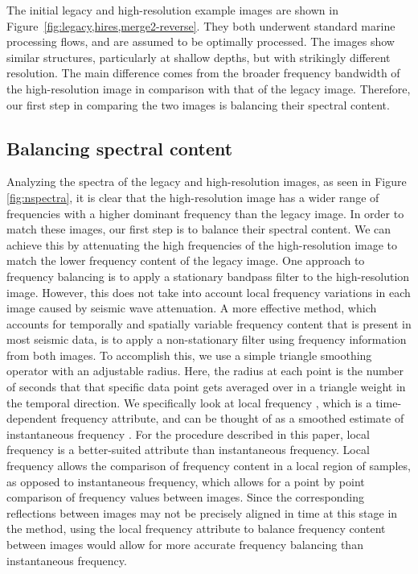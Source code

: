 The initial legacy and high-resolution example images are shown in Figure~\ref{fig:legacy,hires,merge2-reverse}.
They both underwent standard marine processing flows, and are assumed to be optimally processed.
The images show similar structures, particularly at shallow depths, but with strikingly different resolution.
The main difference comes from the broader frequency bandwidth of the high-resolution image in comparison with that of the legacy image.
Therefore, our first step in comparing the two images is balancing their spectral content.

\subsection{Balancing spectral content}

Analyzing the spectra of the legacy and high-resolution images, as seen in Figure \ref{fig:nspectra}, it is clear that the high-resolution image has a wider range of frequencies with a higher dominant frequency than the legacy image.
In order to match these images, our first step is to balance their spectral content.
We can achieve this by attenuating the high frequencies of the high-resolution image to match the lower frequency content of the legacy image.
One approach to frequency balancing is to apply a stationary bandpass filter to the high-resolution image.
However, this does not take into account local frequency variations in each image caused by seismic wave attenuation.
A more effective method, which accounts for temporally and spatially variable frequency content that is present in most seismic data, is to apply a non-stationary filter using frequency information from both images.
To accomplish this, we use a simple triangle smoothing operator with an adjustable radius.
Here, the radius at each point is the number of seconds that that specific data point gets averaged over in a triangle weight in the temporal direction.
We specifically look at local frequency \cite[]{attr}, which is a time-dependent frequency attribute, and can be thought of as a smoothed estimate of instantaneous frequency \cite[]{white}.
For the procedure described in this paper, local frequency is a better-suited attribute than instantaneous frequency.
Local frequency allows the comparison of frequency content in a local region of samples, as opposed to instantaneous frequency, which allows for a point by point comparison of frequency values between images.
Since the corresponding reflections between images may not be precisely aligned in time at this stage in the method, using the local frequency attribute to balance frequency content between images would allow for more accurate frequency balancing than instantaneous frequency.

